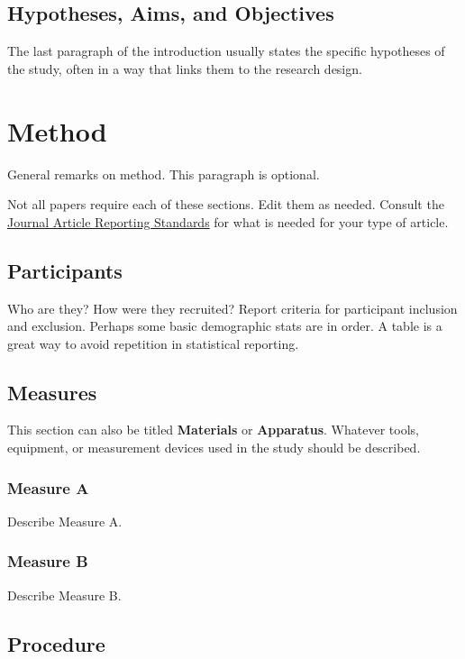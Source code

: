 \documentclass[
  man,
  floatsintext,
  longtable,
  colorlinks=true,linkcolor=blue,citecolor=blue,urlcolor=blue]{apa7}
\begin{document}
\subsection{Hypotheses, Aims, and
Objectives}\label{hypotheses-aims-and-objectives}

The last paragraph of the introduction usually states the specific
hypotheses of the study, often in a way that links them to the research
design.

\section{Method}\label{method}

General remarks on method. This paragraph is optional.

Not all papers require each of these sections. Edit them as needed.
Consult the \href{https://apastyle.apa.org/jars}{Journal Article
Reporting Standards} for what is needed for your type of article.

\subsection{Participants}\label{participants}

Who are they? How were they recruited? Report criteria for participant
inclusion and exclusion. Perhaps some basic demographic stats are in
order. A table is a great way to avoid repetition in statistical
reporting.

\subsection{Measures}\label{measures}

This section can also be titled \textbf{Materials} or
\textbf{Apparatus}. Whatever tools, equipment, or measurement devices
used in the study should be described.

\subsubsection{Measure A}\label{measure-a}

Describe Measure A.

\subsubsection{Measure B}\label{measure-b}

Describe Measure B.

\subsection{Procedure}\label{procedure}
\end{document}
